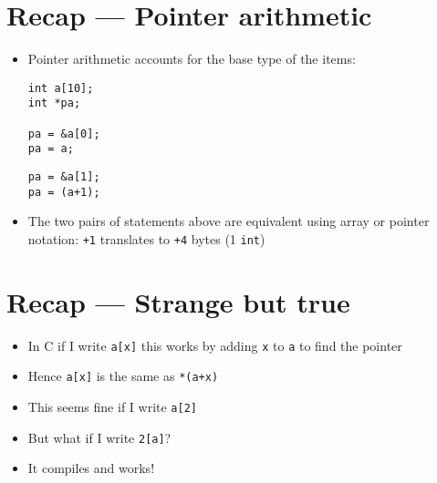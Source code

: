 \documentclass{article}
\begin{document}
\section{Recap --- Pointer arithmetic}
\begin{itemize}
\item Pointer arithmetic accounts for the base type of the items: 

\begin{verbatim}
int a[10];
int *pa;

pa = &a[0];
pa = a;
\end{verbatim}

\begin{center}
\end{center}

\begin{verbatim}
pa = &a[1];
pa = (a+1);
\end{verbatim}

\begin{center}
\end{center}

\item The two pairs of statements above are equivalent using array or pointer notation: \verb!+1! translates to \verb!+4! bytes (1 \verb!int!)
\end{itemize}



\section{Recap --- Strange but true}
\begin{itemize}
\item In C if I write \verb!a[x]! this works by adding \verb!x! to \verb!a! to find the pointer
\item Hence \verb!a[x]! is the same as \verb!*(a+x)!
\item This seems fine if I write \verb!a[2]!
\item But what if I write \verb!2[a]!?
\item It compiles and works!
\end{itemize}
\end{document}
